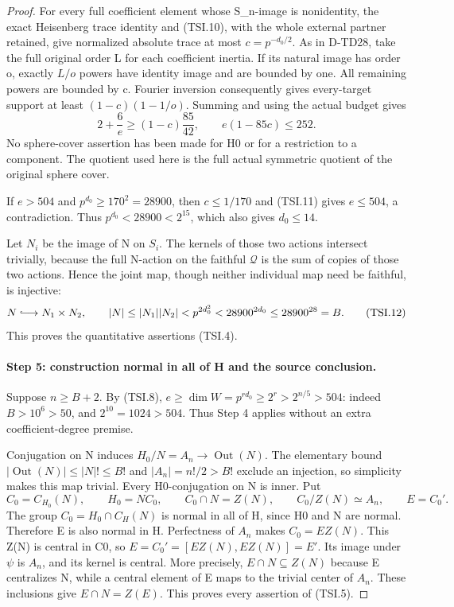 \begin{proof}
For every full coefficient element whose S_n-image is nonidentity,
the exact Heisenberg trace identity and (TSI.10), with the whole
external partner retained, give normalized absolute trace at
most \(c=p^{-d_0/2}\).  As in D-TD28, take the full original
order L for each coefficient inertia.  If its natural image has
order o, exactly \(L/o\) powers have identity image and are
bounded by one.  All remaining powers are bounded by c.
Fourier inversion consequently gives every-target support at
least \((1-c)(1-1/o)\).  Summing and using the actual budget
gives
\[
          2+\frac6e\ge(1-c)\frac{85}{42},\qquad
          e(1-85c)\le252.
 \tag{TSI.11}
\]
No sphere-cover assertion has been made for H0 or for a
restriction to a component.  The quotient used here is the full
actual symmetric quotient of the original sphere cover.

If \(e>504\) and \(p^{d_0}\ge170^2=28900\), then
\(c\le1/170\) and (TSI.11) gives \(e\le504\), a
contradiction.  Thus \(p^{d_0}<28900<2^{15}\), which also
gives \(d_0\le14\).

Let \(N_i\) be the image of N on \(S_i\).  The kernels
of those two actions intersect trivially, because the full
N-action on the faithful \(\mathcal Q\) is the sum of
copies of those two actions.  Hence the joint map, though
neither individual map need be faithful, is injective:
\[
 N\lhook\joinrel\longrightarrow N_1\times N_2,
 \qquad
 |N|\le|N_1||N_2|
       <p^{2d_0^2}<28900^{2d_0}\le28900^{28}=B.
 \tag{TSI.12}
\]
This proves the quantitative assertions (TSI.4).

\paragraph{Step 5: construction normal in all of H and the source conclusion.}
Suppose \(n\ge B+2\).  By (TSI.8),
\(e\ge\dim W=p^{r d_0}\ge2^r>2^{n/5}>504\):
indeed \(B>10^6>50\), and \(2^{10}=1024>504\).
Thus Step 4 applies without an extra coefficient-degree premise.

Conjugation on N induces \(H_0/N=A_n\to\operatorname{Out}(N)\).
The elementary bound \(|\operatorname{Out}(N)|\le|N|!\le B!\)
and \(|A_n|=n!/2>B!\) exclude an injection, so simplicity
makes this map trivial.  Every H0-conjugation on N is inner.
Put
\[
 C_0=C_{H_0}(N),\qquad H_0=NC_0,\qquad
 C_0\cap N=Z(N),\qquad C_0/Z(N)\simeq A_n,
 \qquad E=C_0'.
 \tag{TSI.13}
\]
The group \(C_0=H_0\cap C_H(N)\) is normal in all of H,
since H0 and N are normal.  Therefore E is also normal in H.
Perfectness of \(A_n\) makes \(C_0=E Z(N)\).  This
Z(N) is central in C0, so
\(E=C_0'=[E Z(N),E Z(N)]=E'\).  Its image under \(\psi\)
is \(A_n\), and its kernel is central.  More precisely,
\(E\cap N\subseteq Z(N)\) because E centralizes N,
while a central element of E maps to the trivial center of
\(A_n\).  These inclusions give \(E\cap N=Z(E)\).
This proves every assertion of (TSI.5).


\end{proof}
